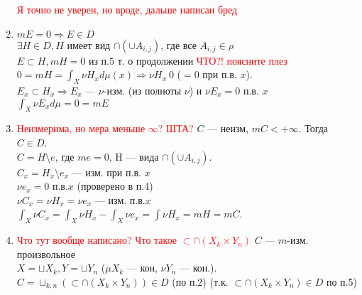 \documentclass[paper=a4, fontsize=17pt]{article}
\begin{document}
\begin{enumerate}
			\textcolor{red}{Я точно не уверен, но вроде, дальше написан бред}
			\item
				$m E = 0 \Rightarrow E \in D$\\
				$\exists H \in D, H$ имеет вид $\cap(\cup A_{i, j})$, где все $A_{i,j} \in \rho$ \\
				$E \subset H , m H = 0$ из п.5 т. о продолжении \textcolor{red}{ЧТО?! поясните плез}\\
				$0 = m H = \int_X\nu H_x d\mu(x) \Rightarrow \nu H_x ~ 0$ ($ = 0$ при п.в. $x$).\\
				$E_x \subset H_x \Rightarrow E_x$ --- $\nu$-изм. (из полноты $\nu$) и $\nu E_x = 0$ п.в. $x$\\
				$\int_X \nu E_x d\mu = 0 = m E$
			\item
				\textcolor{red}{Неизмерима, но мера меньше $\infty$? ШТА?}
				$C$ --- неизм, $m C < +\infty$. Тогда $C \in D$.\\
				$C = H \setminus e$, где $m e = 0$, H --- вида $\cap(\cup A_{i, j})$.\\
				$C_x = H_x \setminus e_x$ --- изм. при п.в. $x$\\
				$\nu e_x = 0$ п.в.$x$ (проверено в п.4)\\
				$\nu C_x = \nu H_x = \nu e_x$ --- изм. п.в.$x$\\
				$\int_X\nu C_x = \int_X\nu H_x - \int_X\nu e_x = \int\nu H_x = m H = m C$.
			\item
				\textcolor{red}{Что тут вообще написано? Что такое $\subset \cap(X_k \times Y_n)$}
				$C$ --- $m$-изм. произвольное\\
				$X = \sqcup X_k, Y = \sqcup Y_n$ ($\mu X_k$ --- кон, $\nu Y_n$ --- кон.).\\
				$C = \sqcup_{k,n}(\subset \cap(X_k \times Y_n)) \in D$ (по п.2) (т.к. $\subset \cap(X_k \times Y_n) \in D$ по п.5)
		\end{enumerate}
\end{document}
